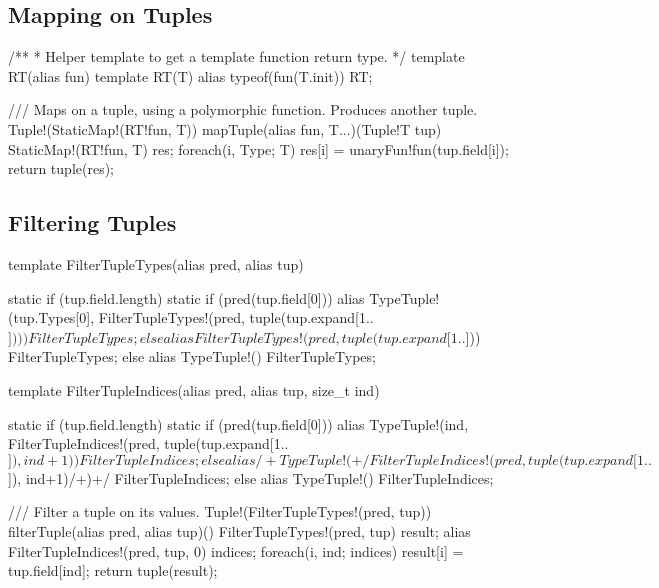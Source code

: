 \subsection{Mapping on Tuples}\label{mappingontuples}

\begin{dcode}
/**
 * Helper template to get a template function return type.
 */
template RT(alias fun)
{
    template RT(T)
    {
        alias typeof(fun(T.init)) RT;
    }
}

/// Maps on a tuple, using a polymorphic function. Produces another tuple.
Tuple!(StaticMap!(RT!fun, T)) mapTuple(alias fun, T...)(Tuple!T tup)
{
    StaticMap!(RT!fun, T) res;
    foreach(i, Type; T) res[i] = unaryFun!fun(tup.field[i]);
    return tuple(res);
}
\end{dcode}


\subsection{Filtering Tuples}\label{filteringtuples}


\begin{dcode}
template FilterTupleTypes(alias pred, alias tup)
{
    static if (tup.field.length)
    {
        static if (pred(tup.field[0]))
            alias TypeTuple!(tup.Types[0], FilterTupleTypes!(pred, tuple(tup.expand[1..$]))) FilterTupleTypes;
        else
            alias FilterTupleTypes!(pred, tuple(tup.expand[1..$])) FilterTupleTypes;
    }
    else
    {
        alias TypeTuple!() FilterTupleTypes;
    }

}

template FilterTupleIndices(alias pred, alias tup, size_t ind)
{
    static if (tup.field.length)
    {
        static if (pred(tup.field[0]))
            alias TypeTuple!(ind, FilterTupleIndices!(pred, tuple(tup.expand[1..$]), ind+1)) FilterTupleIndices;
        else
            alias /+TypeTuple!(+/FilterTupleIndices!(pred, tuple(tup.expand[1..$]), ind+1)/+)+/ FilterTupleIndices;
    }
    else
    {
        alias TypeTuple!() FilterTupleIndices;
    }

}

/// Filter a tuple on its values.
Tuple!(FilterTupleTypes!(pred, tup)) filterTuple(alias pred, alias tup)()
{
    FilterTupleTypes!(pred, tup) result;
    alias FilterTupleIndices!(pred, tup, 0) indices;
    foreach(i, ind; indices)
    {
        result[i] = tup.field[ind];
    }
    return tuple(result);
}
\end{dcode}

